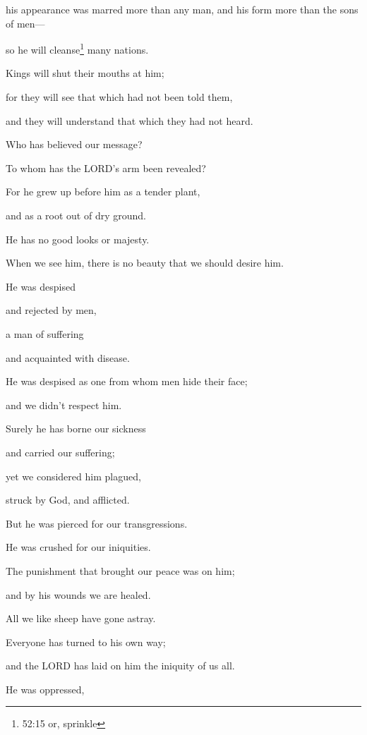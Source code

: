 his appearance was marred more than any man, and his form more than the sons of
men—

\myverse{}so he will cleanse\footnote{52:15 or, sprinkle} many nations.

Kings will shut their mouths at him;

for they will see that which had not been told them,

and they will understand that which they had not heard.




\mychapter{} \myverse*{}Who has believed our message?

\quad\quad To whom has the LORD’s arm been revealed?

\myverse{}For he grew up before him as a tender plant,

and as a root out of dry ground.

He has no good looks or majesty.

When we see him, there is no beauty that we should desire him.

\myverse{}He was despised

and rejected by men,

a man of suffering

and acquainted with disease.

He was despised as one from whom men hide their face;

and we didn’t respect him.


\vspace{\baselineskip} \myverse{}Surely he has borne our sickness

and carried our suffering;

yet we considered him plagued,

struck by God, and afflicted.

\myverse{}But he was pierced for our transgressions.

He was crushed for our iniquities.

The punishment that brought our peace was on him;

and by his wounds we are healed.

\myverse{}All we like sheep have gone astray.

Everyone has turned to his own way;

and the LORD has laid on him the iniquity of us all.


\vspace{\baselineskip} \myverse{}He was oppressed,


